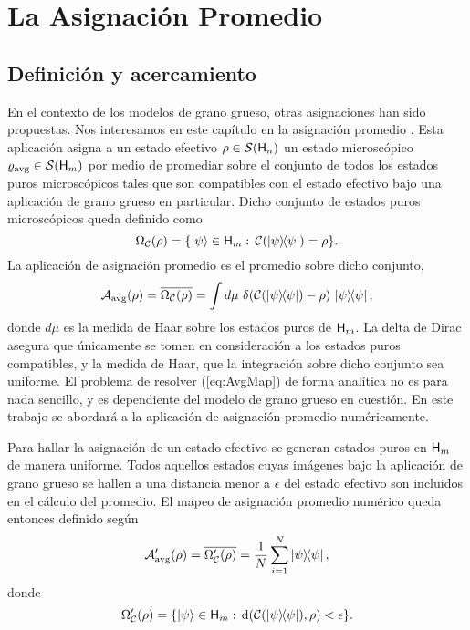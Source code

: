 \chapter{La Asignación Promedio}

\section{Definición y acercamiento}

En el contexto de los modelos de grano grueso, otras asignaciones han sido propuestas. Nos interesamos en este capítulo en la asignación promedio \cite{Macro-To-Micro}. Esta aplicación asigna a un estado efectivo $\rho \in \mathcal{S}({\sf H}_{n})$ un estado microscópico $\varrho_{\text{avg}} \in \mathcal{S}({\sf H}_{m})$ por medio de promediar sobre el conjunto de todos los estados puros microscópicos tales que son compatibles con el estado efectivo bajo una aplicación de grano grueso en particular. Dicho conjunto de estados puros microscópicos queda definido como
\begin{equation}\label{eq:Omega}
    \Omega_{\mcC}(\rho) = \{\ket{\psi}\in\hilbert_{m}:\, \mcC(\dyad{\psi}) = \rho   \}.
\end{equation}
La aplicación de asignación promedio es el promedio sobre dicho conjunto, \ie 
\begin{equation}\label{eq:AvgMap}
    \mcA_{\avg}(\rho) = \overline{\Omega_{\mcC}(\rho)} = \int d \mu\,\, \delta(\mcC(\dyad{\psi})-\rho)\,\dyad{\psi},
\end{equation}
donde $d\mu$ es la medida de Haar sobre los estados puros de ${\sf H}_{m}$. La delta de Dirac asegura que únicamente se tomen en consideración a los estados puros compatibles, y la medida de Haar, que la integración sobre dicho conjunto sea uniforme. El problema de resolver (\ref{eq:AvgMap}) de forma analítica no es para nada sencillo, y es dependiente del modelo de grano grueso en cuestión. En este trabajo se abordará a la aplicación de asignación promedio numéricamente.

Para hallar la asignación de un estado efectivo se generan estados puros en ${\sf H}_{m}$ de manera uniforme. Todos aquellos estados cuyas imágenes bajo la aplicación de grano grueso se hallen a una distancia menor a $\epsilon$ del estado efectivo son incluidos en el cálculo del promedio. El mapeo de asignación promedio numérico queda entonces definido según
\begin{equation}\label{eq:AvgMapNum}
    \mcA'_{\avg}(\rho) = \overline{\Omega'_{\mcC}(\rho)} = \frac{1}{N}\sum_{i=1}^{N}\dyad{\psi},
\end{equation}
donde
\begin{equation}\label{eq:OmegaNum}
    \Omega'_{\mcC}(\rho) = \{\ket{\psi}\in\hilbert_{m}:\, \text{d}(\mcC(\dyad{\psi}),\rho)<\epsilon  \}.
\end{equation}

